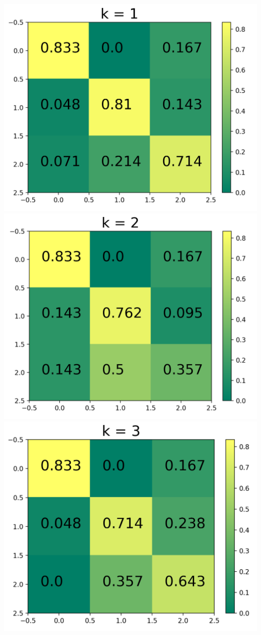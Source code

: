\documentclass[11pt]{article}
\begin{document}
\begin{center}
\includegraphics[scale=0.2]{Confusion_matrix(k=1)}
\includegraphics[scale=0.2]{Confusion_matrix(k=2)}
\includegraphics[scale=0.2]{Confusion_matrix(k=3)}

\end{center}
\end{document}
